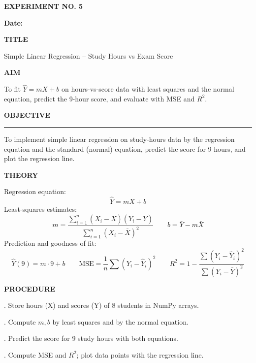 \documentclass[11pt,twoside]{article}
\newcommand{\expheading}[1]{{\fontsize{14}{17}\selectfont\textbf{#1}\par}}
\newcommand{\fullrule}{\noindent\rule{\textwidth}{0.6pt}\par}
\begin{document}
\sloppy

{\setlength{\parskip}{1pt}\setlength{\abovedisplayskip}{2pt}\setlength{\belowdisplayskip}{2pt}
\begin{center}
\expheading{EXPERIMENT NO. 5}
\end{center}
\vspace{2pt}

\noindent\textbf{Date:} \underline{\hspace{2.6cm}}\par
\vspace{6pt}

\expheading{TITLE}
\vspace{4pt}
\noindent Simple Linear Regression -- Study Hours vs Exam Score\par
\vspace{4pt}

\expheading{AIM}
\vspace{4pt}
\noindent To fit $\hat{Y}=mX+b$ on hours-vs-score data with least squares and the normal equation, predict the 9-hour score, and evaluate with MSE and $R^2$. \par
\vspace{4pt}

\expheading{OBJECTIVE}
\vspace{2pt}
\fullrule
\vspace{4pt}
\noindent To implement simple linear regression on study-hours data by the regression equation and the standard (normal) equation, predict the score for 9 hours, and plot the regression line. \par
\vspace{4pt}

\expheading{THEORY}
\vspace{4pt}
Regression equation:
\[\hat{Y}=mX+b\]
Least-squares estimates:
\[m=\frac{\sum_{i=1}^{n}(X_i-\bar{X})(Y_i-\bar{Y})}{\sum_{i=1}^{n}(X_i-\bar{X})^2}\qquad b=\bar{Y}-m\bar{X}\]
Prediction and goodness of fit:
\[\hat{Y}(9)=m\cdot9+b\qquad \mathrm{MSE}=\frac{1}{n}\sum(Y_i-\hat{Y}_i)^2\qquad R^2=1-\frac{\sum(Y_i-\hat{Y}_i)^2}{\sum(Y_i-\bar{Y})^2}\]
\vspace{4pt}

\expheading{PROCEDURE}
\vspace{4pt}
. Store hours (X) and scores (Y) of 8 students in NumPy arrays.\par
{}. Compute $m,b$ by least squares and by the normal equation.\par
{}. Predict the score for 9 study hours with both equations.\par
{}. Compute MSE and $R^2$; plot data points with the regression line. \par
\vspace{4pt}

}
\end{document}
